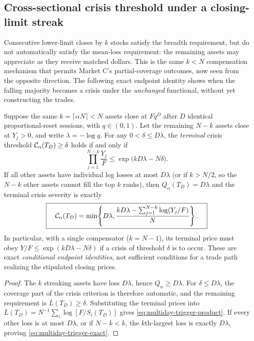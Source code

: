 \documentclass[review,hidelinks,onefignum,onetabnum]{siamonline250211}
\begin{document}
\subsection{Cross-sectional crisis threshold under a closing-limit streak}\label{subsec:multiday-breadth}
Consecutive lower-limit closes by $k$ stocks satisfy the breadth requirement, but do not automatically satisfy the mean-loss requirement: the remaining assets may appreciate as they receive matched dollars. This is the same $k<N$ compensation mechanism that permits Market C's partial-coverage outcomes, now seen from the opposite direction. The following exact endpoint identity shows when the falling majority becomes a crisis under the \emph{unchanged} functional, without yet constructing the trades.
\begin{proposition}\label{prop:multiday-crisis-trigger}
Suppose the same $k=\lceil\alpha N\rceil<N$ assets close at $Fq^D$ after $D$ identical proportional-reset sessions, with $q\in(0,1)$. Let the remaining $N-k$ assets close at $Y_j>0$, and write $\lambda=-\log q$. For any $0<\delta\le D\lambda$, the \emph{terminal} crisis threshold $\mathcal{C}_\alpha(T_D)\ge\delta$ holds if and only if
\begin{equation}\label{eq:multiday-trigger-product}
\boxed{\qquad \prod_{j=1}^{N-k}\frac{Y_j}{F}
 \le\exp\bigl(kD\lambda-N\delta\bigr).\qquad}
\end{equation}
If all other assets have individual log losses at most $D\lambda$ (or if $k>N/2$, so the $N-k$ other assets cannot fill the top $k$ ranks), then $Q_\alpha(T_D)=D\lambda$ and the terminal crisis severity is exactly
\begin{equation}\label{eq:multiday-trigger-exact}
\boxed{\quad\mathcal{C}_\alpha(T_D)=\min\!\left\{D\lambda,
 \frac{kD\lambda-\sum_{j=1}^{N-k}\log(Y_j/F)}{N}\right\}.\quad}
\end{equation}
In particular, with a single compensator ($k=N-1$), its terminal price must obey $Y/F\le\exp(kD\lambda-N\delta)$ if a crisis of threshold $\delta$ is to occur. These are exact \emph{conditional endpoint identities}, not sufficient conditions for a trade path realizing the stipulated closing prices.
\end{proposition}
\begin{proof}
The $k$ streaking assets have loss $D\lambda$, hence $Q_\alpha\ge D\lambda$. For $\delta\le D\lambda$, the coverage part of the crisis criterion is therefore automatic, and the remaining requirement is $\overline L(T_D)\ge\delta$. Substituting the terminal prices into $\overline L(T_D)=N^{-1}\sum_i\log[F/S_i(T_D)]$ gives \eqref{eq:multiday-trigger-product}. If every other loss is at most $D\lambda$, or if $N-k<k$, the $k$th-largest loss is exactly $D\lambda$, proving \eqref{eq:multiday-trigger-exact}.
\end{proof}
\end{document}
